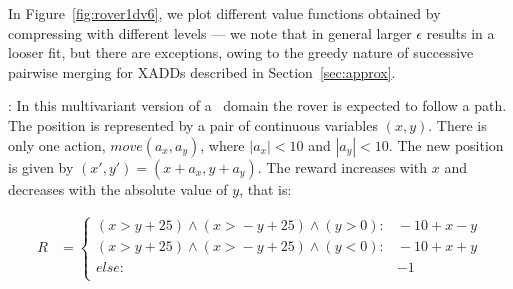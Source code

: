 In Figure~\ref{fig:rover1dv6}, we plot different value functions obtained by compressing with different levels --- we note that in general larger $\epsilon$ results in a looser fit, but there are exceptions, owing to the greedy nature of successive pairwise merging for XADDs described in Section~\ref{sec:approx}.

\MarsRoverBi: In this multivariant version of a \MarsRover~domain %
 the rover is expected to follow a path. The position is represented by a pair of continuous variables $(x,y)$. There is only one action, $move(a_x,a_y)$, where $|a_x| < 10$ and $|a_y| < 10$. The new position is given by $(x',y') = ( x+a_x, y+a_y)$. The reward increases with $x$ and decreases with the absolute value of $y$, that is:

\vspace{-6mm}
{\footnotesize
\begin{align*}
R & = \begin{cases}
(x \!>\! y +25) \wedge (x \!>\! - y  +25) \wedge (y \!>\!0): &\!\!-10 + x -y\\
(x \!>\! y +25) \wedge (x \!>\! - y  +25) \wedge (y \!<\!0): &\!\!-10 + x +y\\
else: & -1\\
\end{cases}
\end{align*}}
\vspace{-6mm}

